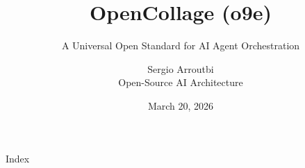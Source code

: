 \documentclass{beamer}
\title{OpenCollage (o9e)}
\subtitle{A Universal Open Standard for AI Agent Orchestration}
\author{Sergio Arroutbi \\ Open-Source AI Architecture}
\date{March 20, 2026}
\begin{document}
\begin{frame}
  \titlepage
\end{frame}

\begin{frame}{Index}
  \tiny
  \tableofcontents
\end{frame}
























\end{document}
